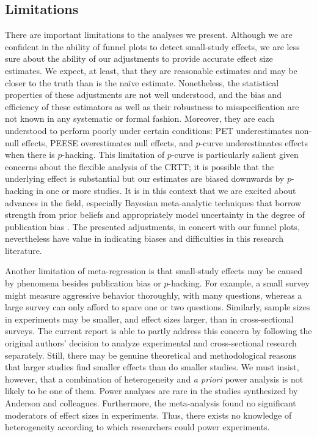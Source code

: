 \documentclass[man, mask]{apa6}
\begin{document}
\subsection{Limitations}
There are important limitations to the analyses we present.  Although we are confident in the ability of funnel plots to detect small-study effects, we are less sure about the ability of our adjustments to provide accurate effect size estimates.  We expect, at least, that they are reasonable estimates and may be closer to the truth than is the na{\"i}ve estimate.  Nonetheless, the statistical properties of these adjustments are not well understood, and the bias and efficiency of these estimators as well as their robustness to misspecification are not known in any systematic or formal fashion.  Moreover, they are each understood to perform poorly under certain conditions: PET underestimates non-null effects, PEESE overestimates null effects, and $p$-curve underestimates effects when there is $p$-hacking. This limitation of $p$-curve is particularly salient given concerns about the flexible analysis of the CRTT; it is possible that the underlying effect is substantial but our estimates are biased downwards by $p$-hacking in one or more studies.  %
It is in this context that we are excited about advances in the field, especially Bayesian meta-analytic techniques that borrow strength from prior beliefs and appropriately model uncertainty in the degree of publication bias \citep{Guan:Vandekerckhove:2015}. 
The presented adjustments, in concert with our funnel plots, nevertheless have value in indicating biases and difficulties in this research literature. 

Another limitation of meta-regression is that small-study effects may be caused by phenomena besides publication bias or $p$-hacking. For example, a small survey might measure aggressive behavior thoroughly, with many questions, whereas a large survey can only afford to spare one or two questions. Similarly, sample sizes in experiments may be smaller, and effect sizes larger, than in cross-sectional surveys. The current report is able to partly address this concern by following the original authors' decision to analyze experimental and cross-sectional research separately. Still, there may be genuine theoretical and methodological reasons that larger studies find smaller effects than do smaller studies. We must insist, however, that a combination of heterogeneity and {\em a priori} power analysis is not likely to be one of them. Power analyses are rare in the studies synthesized by Anderson and colleagues. Furthermore, the meta-analysis found no significant moderators of effect sizes in experiments. Thus, there exists no knowledge of heterogeneity according to which researchers could power experiments.  
\end{document}
